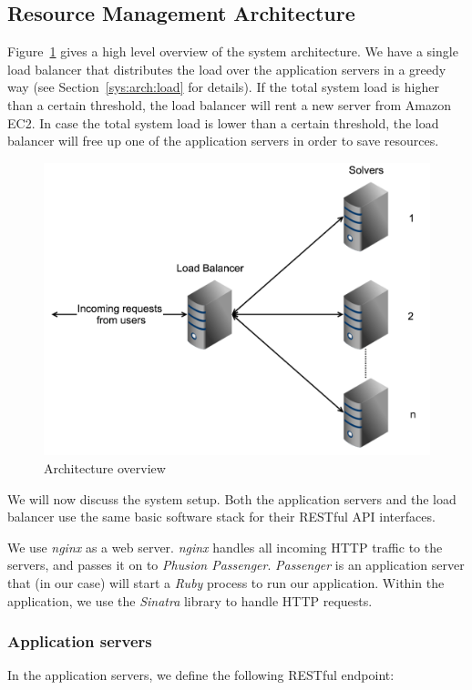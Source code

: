 \subsection{Resource Management Architecture}
	Figure~\ref{fig:sys:arch} gives a high level overview of the system architecture.
	We have a single load balancer that distributes the load over the application servers in a greedy way (see Section~\ref{sys:arch:load} for details).
	If the total system load is higher than a certain threshold, the load balancer will rent a new server from Amazon EC2.
	In case the total system load is lower than a certain threshold, the load balancer will free up one of the application servers in order to save resources.

	\begin{figure}[H]
		\includegraphics[width=\linewidth]{img/arch}
		\caption{Architecture overview}
		\label{fig:sys:arch}
	\end{figure}

	We will now discuss the system setup.
	Both the application servers and the load balancer use the same basic software stack for their RESTful API interfaces.
	
	We use \textit{nginx} as a web server.
	\textit{nginx} handles all incoming HTTP traffic to the servers, and passes it on to \textit{Phusion Passenger}.
	\textit{Passenger} is an application server that (in our case) will start a \textit{Ruby} process to run our application.
	Within the application, we use the \textit{Sinatra} library to handle HTTP requests.
	
	\subsubsection{Application servers}
		In the application servers, we define the following RESTful endpoint:
		

